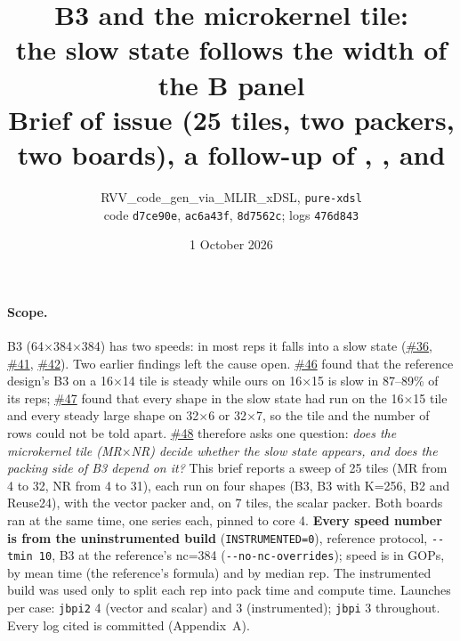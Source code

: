 \documentclass[10pt,a4paper]{article}
\title{\vspace{-1.2cm}\textbf{B3 and the microkernel tile:\\ the slow state follows the width of the B panel}\\[2pt]
\large Brief of issue \iss{48} (25 tiles, two packers, two boards), a follow-up of \iss{41}, \iss{44}, \iss{46} and \iss{47}}
\author{RVV\_code\_gen\_via\_MLIR\_xDSL, \texttt{pure-xdsl}\\ code \texttt{d7ce90e}, \texttt{ac6a43f}, \texttt{8d7562c}; logs \texttt{476d843}}
\date{1 October 2026}
\newcommand{\iss}[1]{\href{https://github.com/JieGH/RVV_code_gen_via_MLIR_xDSL/issues/#1}{\##1}}
\begin{document}
\maketitle
\vspace{-0.8cm}

\paragraph{Scope.} B3 (64$\times$384$\times$384) has two speeds: in most reps it falls into a slow state
(\iss{36}, \iss{41}, \iss{42}). Two earlier findings left the cause open. \iss{46} found that the reference design's B3
on a 16$\times$14 tile is steady while ours on 16$\times$15 is slow in 87--89\% of its reps; \iss{47} found that every
shape in the slow state had run on the 16$\times$15 tile and every steady large shape on 32$\times$6 or 32$\times$7, so
the tile and the number of rows could not be told apart. \iss{48} therefore asks one question: \emph{does the
microkernel tile (MR$\times$NR) decide whether the slow state appears, and does the packing side of B3 depend on it?}
This brief reports a sweep of 25 tiles (MR from 4 to 32, NR from 4 to 31), each run on four shapes (B3, B3 with
K=256, B2 and Reuse24), with the vector packer and, on 7 tiles, the scalar packer. Both boards ran at the same time,
one series each, pinned to core 4. \textbf{Every speed number is from the uninstrumented build}
(\texttt{INSTRUMENTED=0}), reference protocol, \texttt{-{}-tmin 10}, B3 at the reference's nc=384
(\texttt{-{}-no-nc-overrides}); speed is in GOPs, by mean time (the reference's formula) and by median rep. The
instrumented build was used only to split each rep into pack time and compute time. Launches per case:
\texttt{jbpi2} 4 (vector and scalar) and 3 (instrumented); \texttt{jbpi} 3 throughout. Every log cited is committed
(Appendix~A).
\end{document}
